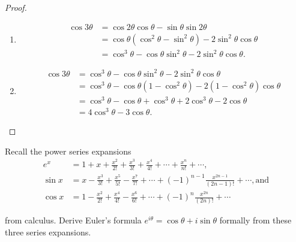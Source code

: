 \begin{proof}
    \begin{enumerate}[topsep=0pt,itemsep=0pt,label={\textbf{\alph*.}}]
        \item \begin{align*}
                  \cos{3\theta} & = \cos{2\theta}\cos{\theta} - \sin{\theta}\sin{2\theta}                             \\
                                & = \cos{\theta}(\cos^{2}{\theta} - \sin^{2}{\theta}) - 2\sin^{2}{\theta}\cos{\theta} \\
                                & = \cos^{3}{\theta} - \cos{\theta}\sin^{2}{\theta} - 2\sin^{2}{\theta}\cos{\theta}.
              \end{align*}
        \item \begin{align*}
                  \cos{3\theta} & = \cos^{3}{\theta} - \cos{\theta}\sin^{2}{\theta} - 2\sin^{2}{\theta}\cos{\theta}             \\
                                & = \cos^{3}{\theta} - \cos{\theta}(1 - \cos^{2}{\theta}) - 2(1 - \cos^{2}{\theta})\cos{\theta} \\
                                & = \cos^{3}{\theta} - \cos{\theta} + \cos^{3}{\theta} + 2\cos^{3}{\theta} - 2\cos{\theta}      \\
                                & = 4\cos^{3}{\theta} - 3\cos{\theta}.
              \end{align*}
    \end{enumerate}
\end{proof}

\newpage
\begin{exercise}
    Recall the power series expansions
    \begin{align*}
        e^{x}  & = 1 + x + \frac{x^{2}}{2!} + \frac{x^{3}}{3!} + \frac{x^{4}}{4!} + \cdots + \frac{x^{n}}{n!} + \cdots,                            \\
        \sin x & = x - \frac{x^{3}}{3!} + \frac{x^{5}}{5!} - \frac{x^{7}}{7!} + \cdots + {(-1)}^{n-1}\frac{x^{2n-1}}{(2n-1)!} + \cdots, \text{and} \\
        \cos x & = 1 - \frac{x^{2}}{2!} + \frac{x^{4}}{4!} - \frac{x^{6}}{6!} + \cdots + {(-1)}^{n}\frac{x^{2n}}{(2n)!} + \cdots
    \end{align*}

    from calculus. Derive Euler's formula $e^{i\theta} = \cos{\theta} + i\sin{\theta}$ formally from these three series expansions.
\end{exercise}

